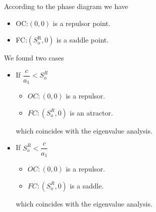 According to the phase diagram we have
\begin{itemize}
	\item OC:$\left(0,0\right)$ is a repulsor point.
	\item FC:$\left(S^{\text{R}}_{\text{o}},0\right)$ is a saddle point.
\end{itemize}

We found two cases
\begin{itemize}
	\item  If  $\dfrac{c}{a_1} < S_o^R$
	      \begin{itemize}
		      \item $OC : (0,0)  $ is a repulsor.
		      \item   $FC : (S_o^R,0)  $ is an  atractor.
	      \end{itemize}
	      which coincides with the eigenvalue analysis.


	\item If  $   S_o^R   < \dfrac{c}{a_1}$
	      \begin{itemize}
		      \item $OC : (0,0)  $ is a repulsor.
		      \item   $FC : (S_o^R,0)  $ is a   saddle.
	      \end{itemize}
	      which coincides with the eigenvalue analysis.
\end{itemize}



